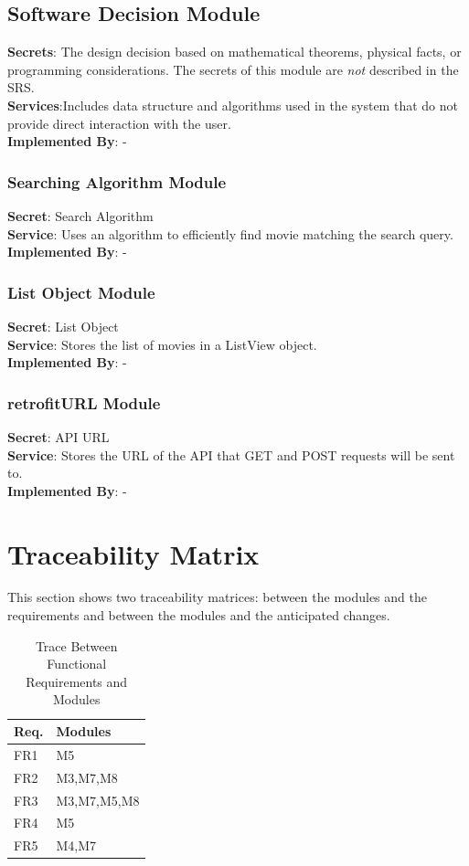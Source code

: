 \documentclass[12pt, titlepage]{article}
\begin{document}
	
	\subsection{Software Decision Module}
	\textbf{Secrets}: The design decision based on mathematical theorems, physical facts, or programming considerations. The secrets of this module are \emph{not} described in the SRS. \\
	\textbf{Services}:Includes data structure and algorithms used in the system that do not provide direct interaction with the user. \\
	\textbf{Implemented By}:  -\\
	\subsubsection{Searching Algorithm Module}
	\textbf{Secret}:  Search Algorithm \\
	\textbf{Service}: Uses an algorithm to efficiently find movie matching the search query. \\
	\textbf{Implemented By}: - \\
	\subsubsection{List Object Module}
	\textbf{Secret}: List Object \\
	\textbf{Service}: Stores the list of movies in a ListView object.  \\ 
	\textbf{Implemented By}: -\\
	\subsubsection{retrofitURL Module}
	\textbf{Secret}: API URL \\
	\textbf{Service}: Stores the URL of the API  that GET and POST requests will be sent to. \\ 
	\textbf{Implemented By}: -\\

\section{Traceability Matrix} \label{SecTM}

This section shows two traceability matrices: between the modules and the
requirements and between the modules and the anticipated changes.

\begin{table}[H]
\centering
\begin{tabular}{p{} p{}}
\toprule
\textbf{Req.} & \textbf{Modules}\\
\midrule
FR1 & M5\\
FR2 & M3,M7,M8\\
FR3 & M3,M7,M5,M8\\
FR4 & M5\\
FR5 & M4,M7\\
\bottomrule
\end{tabular}
\caption{Trace Between Functional Requirements and Modules}
\label{TblRT}
\end{table}
\end{document}
